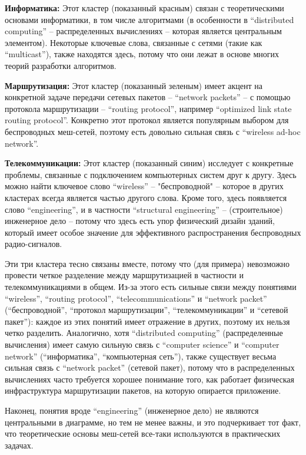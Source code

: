 \documentclass[%
]{report}
\begin{document}
\textbf{Информатика:} Этот кластер (показанный красным)
связан с теоретическими основами информатики,
в том числе алгоритмами
(в особенности в ``distributed computing'' -- распределенных вычислениях -- 
которая является центральным элементом).
Некоторые ключевые слова,
связанные с сетями (такие как ``multicast''),
также находятся здесь,
потому что они лежат в основе
многих теорий разработки алгоритмов.

\textbf{Маршрутизация:} Этот кластер (показанный зеленым)
имеет акцент на конкретной задаче
передачи сетевых пакетов -- 
``network packets'' -- с помощью протокола маршрутизации -- ``routing protocol'',
например ``optimized link state routing protocol''.
Конкретно этот протокол является популярным выбором для
беспроводных меш-сетей,
поэтому есть довольно сильная связь с ``wireless ad-hoc network''.

\textbf{Телекоммуникации:} Этот кластер (показанный синим)
исследует с конкретные проблемы,
связанные с подключением компьютерных систем друг к другу.
Здесь можно найти ключевое слово ``wireless'' -- "беспроводной" -- 
которое в других кластерах всегда является частью другого слова. 
Кроме того, здесь появляется слово ``engineering'',
и в частности ``structural engineering'' -- (строительное) инженерное дело --
потому что здесь есть упор физический дизайн зданий,
который имеет особое значение для эффективного распространения
беспроводных радио-сигналов.

Эти три кластера тесно связаны вместе,
потому что (для примера)
невозможно провести четкое разделение между
маршрутизацией в частности и телекоммуникациями в общем.
Из-за этого есть сильные связи между понятиями
``wireless'', ``routing protocol'', ``telecommunications'' и
``network packet'' (``беспроводной'', ``протокол маршрутизации'', ``телекоммуникации''
и ``сетевой пакет''):
каждое из этих понятий имеет отражение в других,
поэтому их нельзя четко разделить.
Аналогично, хотя
``distributed computing'' (распределенные вычисления)
имеет самую сильную связь с ``computer
science'' и ``computer network'' (``информатика'', ``компьютерная сеть''),
также существует весьма сильная связь с 
``network packet'' (сетевой пакет),
потому что в распределенных вычислениях
часто требуется хорошее понимание того,
как работает физическая инфраструктура маршрутизации пакетов,
на которую опирается приложение.

Наконец, понятия вроде  ``engineering'' (инженерное дело)
не являются центральными в диаграмме,
но тем не менее важны,
и это подчеркивает тот факт, 
что теоретические основы меш-сетей
все-таки используются в практических задачах.
\end{document}
